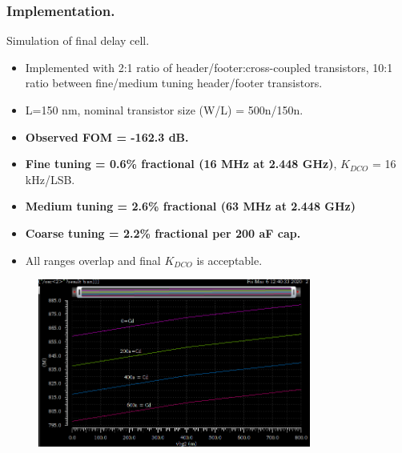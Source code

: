 \documentclass[t, screen, aspectratio=43]{beamer}
\begin{document}
\begin{frame}
	\frametitle{Implementation.}
	\begin{block}{Simulation of final delay cell.}
				\vspace{2em}
		\begin{minipage}{4cm}
			\tiny

			\begin{itemize}[itemsep=4pt,label=\protect---]
				\item Implemented with 2:1 ratio of header/footer:cross-coupled transistors, 10:1 ratio between fine/medium tuning header/footer transistors.
				\item L=150 nm, nominal transistor size (W/L) = 500n/150n.
				\item \textbf{\color{red}Observed FOM = -162.3 dB.}
				\item \textbf{Fine tuning = 0.6\% fractional (16 MHz at 2.448 GHz)}, $K_{DCO}$ = 16 kHz/LSB.
				\item \textbf{Medium tuning = 2.6\% fractional (63 MHz at 2.448 GHz)}
				\item \textbf{Coarse tuning = 2.2\% fractional per 200 aF cap.}
				\item All ranges overlap and final $K_{DCO}$ is acceptable.
			\end{itemize}

		\end{minipage}%
		\begin{minipage}{8cm}
			\begin{figure}[htb!]
			        \centering
			        \includegraphics[width=0.8\textwidth, angle=0]{./tuning_tele_med_coarse}
			\end{figure}
		\end{minipage}%

	\end{block}	
\end{frame}
\end{document}
